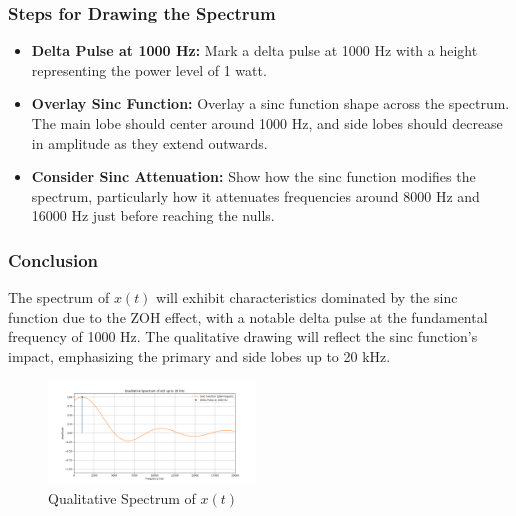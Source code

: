 \subsubsection{Steps for Drawing the Spectrum}
\begin{itemize}
    \item \textbf{Delta Pulse at 1000 Hz:} Mark a delta pulse at 1000 Hz with a height representing the power level of 1 watt.
    \item \textbf{Overlay Sinc Function:} Overlay a sinc function shape across the spectrum. The main lobe should center around 1000 Hz, and side lobes should decrease in amplitude as they extend outwards.
    \item \textbf{Consider Sinc Attenuation:} Show how the sinc function modifies the spectrum, particularly how it attenuates frequencies around 8000 Hz and 16000 Hz just before reaching the nulls.
\end{itemize}

\subsubsection{Conclusion}
The spectrum of $x(t)$ will exhibit characteristics dominated by the sinc function due to the ZOH effect, with a notable delta pulse at the fundamental frequency of 1000 Hz. The qualitative drawing will reflect the sinc function's impact, emphasizing the primary and side lobes up to 20 kHz.

\begin{figure}[h]
    \centering
    \includegraphics[width=0.49\textwidth]{fig/ex3_c_plot}
    \caption{Qualitative Spectrum of \(x(t)\)}
    \label{fig:ex3_c_plot}
\end{figure}
